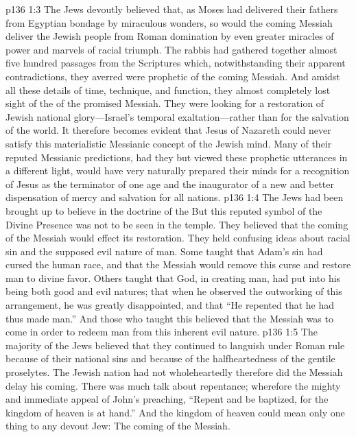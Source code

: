 \vs p136 1:3 The Jews devoutly believed that, as Moses had delivered their fathers from Egyptian bondage by miraculous wonders, so would the coming Messiah deliver the Jewish people from Roman domination by even greater miracles of power and marvels of racial triumph. The rabbis had gathered together almost five hundred passages from the Scriptures which, notwithstanding their apparent contradictions, they averred were prophetic of the coming Messiah. And amidst all these details of time, technique, and function, they almost completely lost sight of the  of the promised Messiah. They were looking for a restoration of Jewish national glory---Israel’s temporal exaltation---rather than for the salvation of the world. It therefore becomes evident that Jesus of Nazareth could never satisfy this materialistic Messianic concept of the Jewish mind. Many of their reputed Messianic predictions, had they but viewed these prophetic utterances in a different light, would have very naturally prepared their minds for a recognition of Jesus as the terminator of one age and the inaugurator of a new and better dispensation of mercy and salvation for all nations.
\pc \vs p136 1:4 The Jews had been brought up to believe in the doctrine of the  But this reputed symbol of the Divine Presence was not to be seen in the temple. They believed that the coming of the Messiah would effect its restoration. They held confusing ideas about racial sin and the supposed evil nature of man. Some taught that Adam’s sin had cursed the human race, and that the Messiah would remove this curse and restore man to divine favor. Others taught that God, in creating man, had put into his being both good and evil natures; that when he observed the outworking of this arrangement, he was greatly disappointed, and that “He repented that he had thus made man.” And those who taught this believed that the Messiah was to come in order to redeem man from this inherent evil nature.
\vs p136 1:5 The majority of the Jews believed that they continued to languish under Roman rule because of their national sins and because of the halfheartedness of the gentile proselytes. The Jewish nation had not wholeheartedly  therefore did the Messiah delay his coming. There was much talk about repentance; wherefore the mighty and immediate appeal of John’s preaching, “Repent and be baptized, for the kingdom of heaven is at hand.” And the kingdom of heaven could mean only one thing to any devout Jew: The coming of the Messiah.
